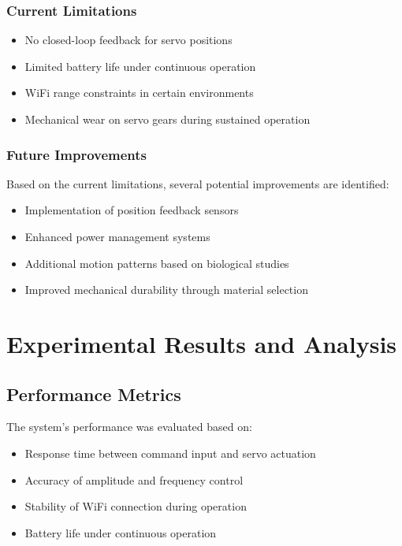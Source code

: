 \documentclass[12pt,a4paper]{report}
\begin{document}
\subsection{Current Limitations}
\begin{itemize}
    \item No closed-loop feedback for servo positions
    \item Limited battery life under continuous operation
    \item WiFi range constraints in certain environments
    \item Mechanical wear on servo gears during sustained operation
\end{itemize}

\subsection{Future Improvements}
Based on the current limitations, several potential improvements are identified:
\begin{itemize}
    \item Implementation of position feedback sensors
    \item Enhanced power management systems
    \item Additional motion patterns based on biological studies
    \item Improved mechanical durability through material selection
\end{itemize}


\chapter{Experimental Results and Analysis}

\section{Performance Metrics}
The system's performance was evaluated based on:
\begin{itemize}
    \item Response time between command input and servo actuation
    \item Accuracy of amplitude and frequency control
    \item Stability of WiFi connection during operation
    \item Battery life under continuous operation
\end{itemize}
\end{document}
